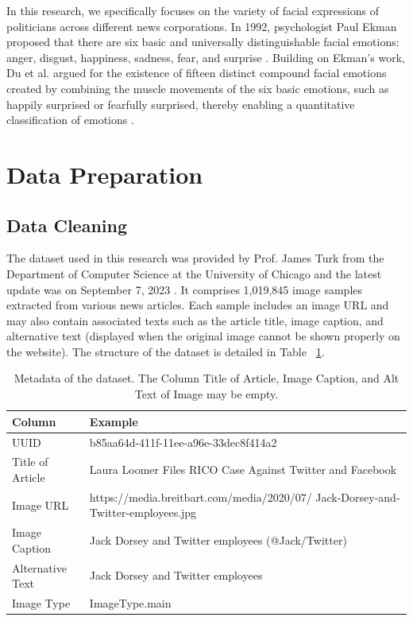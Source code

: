 \documentclass[sigconf]{acmart}
\begin{document}
In this research, we specifically focuses on the variety of facial expressions of politicians across different news corporations. In 1992, psychologist Paul Ekman proposed that there are six basic and universally distinguishable facial emotions: anger, disgust, happiness, sadness, fear, and surprise \cite{emotions}. Building on Ekman’s work, Du et al. argued for the existence of fifteen distinct compound facial emotions created by combining the muscle movements of the six basic emotions, such as happily surprised or fearfully surprised, thereby enabling a quantitative classification of emotions \cite{compoundemotion}.




\section{Data Preparation}\label{sec:data}
\subsection{Data Cleaning}\label{sec:clean}
The dataset used in this research was provided by Prof. James Turk from the Department of Computer Science at the University of Chicago and the latest update was on September 7, 2023 \cite{dataset}. It comprises 1,019,845 image samples extracted from various news articles. Each sample includes an image URL and may also contain associated texts such as the article title, image caption, and alternative text (displayed when the original image cannot be shown properly on the website). The structure of the dataset is detailed in Table ~\ref{tab:metadata}.

\setlength{\textfloatsep}{0pt}
\begin{table}[t]
  \begin{center}
  \renewcommand{\arraystretch}{1.5}
  \begin{tabular}{|l|p{5.5cm}|}
    \hline
    \textbf{Column} & \textbf{Example} \\
    \hline
    UUID & b85aa64d-411f-11ee-a96e-33dec8f414a2 \\
    \hline
    Title of Article & Laura Loomer Files RICO Case Against Twitter and Facebook \\
    \hline
    Image URL & https://media.breitbart.com/media/2020/07/ \newline Jack-Dorsey-and-Twitter-employees.jpg \\
    \hline
    Image Caption & Jack Dorsey and Twitter employees (@Jack/Twitter) \\
    \hline
    Alternative Text & Jack Dorsey and Twitter employees \\
    \hline
    Image Type & ImageType.main \\
    \hline
  \end{tabular}
  \caption{Metadata of the dataset. \newline The Column Title of Article, Image Caption, and Alt Text of Image may be empty.}
  \label{tab:metadata}
  \end{center}
\end{table}
\end{document}
